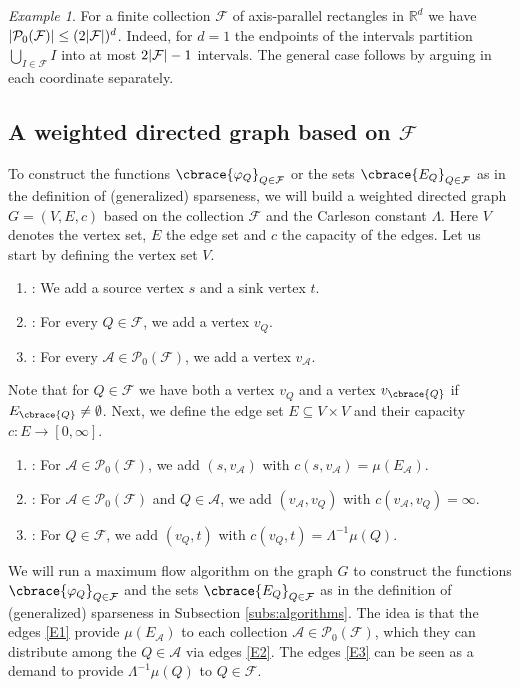 \documentclass[a4paper, oneside,11pt]{amsart}
\theoremstyle{definition}
\theoremstyle{remark}
\newtheorem{example}[theorem]{Example}
\numberwithin{equation}{section}
\newcommand{\R}{\ensuremath{\mathbb{R}}}
\newcommand{\mc}{\mathcal}
\DeclarePairedDelimiter\abs{\lvert}{\rvert}
\DeclarePairedDelimiter\cbrace\{\}
\begin{document}
\begin{example}\label{example:rectangles}
  For a finite collection $\mc{F}$ of axis-parallel rectangles in $\R^d$ we have $\abs{\mc{P}_0(\mc{F})} \leq (2\abs{\mc{F}})^d$. Indeed, for $d=1$  the endpoints of the intervals partition $\bigcup_{I \in \mc{F}}I$ into at most $2\abs{\mc{F}}-1$ intervals. The general case follows by arguing in each coordinate separately.
\end{example}



\subsection{A weighted directed graph based on \texorpdfstring{$\mc{F}$}{F}}\label{subs:graph}
To construct the functions $\cbrace{\varphi_Q}_{Q \in \mc{F}}$ or the sets $\cbrace{E_Q}_{Q \in \mc{F}}$ as in the definition of (generalized) sparseness, we will build a weighted directed graph $G=(V,E,c)$ based on the collection $\mc{F}$ and the Carleson constant $\Lambda$. Here $V$ denotes the vertex set, $E$ the edge set and $c$ the capacity of the edges. Let us start by defining the vertex set $V$.
\begin{enumerate}[($\mathrm{V}_1$)]
  \item : We add a source vertex $s$ and a sink vertex $t$. \label{V1}
  \item : For every $Q \in \mc{F}$, we add a vertex $v_Q$. \label{V2}
  \item : For every $\mc{A} \in \mc{P}_0(\mc{F})$, we add a vertex $v_{\mc{A}}$. \label{V3}
\end{enumerate}
Note that for $Q \in \mc{F}$ we have both a vertex $v_Q$ and a vertex $v_{\cbrace{Q}}$ if $E_{\cbrace{Q}}\neq \emptyset$. Next, we define the edge set $E \subseteq V\times V$ and their capacity $c\colon E \to [0,\infty]$.
\begin{enumerate}[($\mathrm{E}_1$)]
  \item : For $\mc{A} \in \mc{P}_0(\mc{F})$, we add $(s, v_\mc{A})$ with  $c(s, v_\mc{A}) = \mu(E_{\mc{A}})$. \label{E1}
  \item : For  $\mc{A} \in \mc{P}_0(\mc{F})$ and $Q \in \mc{A}$, we add $(v_\mc{A}, v_Q)$ with $c(v_\mc{A}, v_Q) = \infty$. \label{E2}
  \item : For  $Q \in \mc{F}$, we add $(v_Q, t)$ with  $c(v_Q, t) = \Lambda^{-1} \mu(Q)$. \label{E3}
\end{enumerate}
We will run a maximum flow algorithm on the graph $G$ to construct the functions $\cbrace{\varphi_Q}_{Q \in \mc{F}}$ and the sets $\cbrace{E_Q}_{Q \in \mc{F}}$ as in the definition of (generalized) sparseness in Subsection \ref{subs:algorithms}. The idea is that the edges \ref{E1} provide $\mu(E_\mc{A})$ to each collection $\mc{A} \in \mc{P}_0(\mc{F})$, which they can distribute among the $Q \in \mc{A}$ via edges \ref{E2}. The edges \ref{E3} can be seen as a demand to provide $\Lambda^{-1}\mu(Q)$ to $Q \in \mc{F}$.
\end{document}
